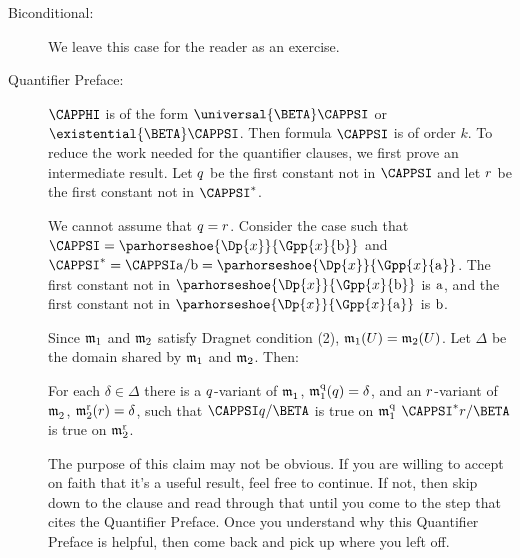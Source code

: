 \begin{PROOF}
\begin{description}
\begin{description}
\item[Biconditional:] We leave this case for the reader as an exercise.

\item[Quantifier Preface:] $\CAPPHI$ is of the form $\universal{\BETA}\CAPPSI$ or $\existential{\BETA}\CAPPSI$.
Then formula $\CAPPSI$ is of order $k$. To reduce the work needed for the quantifier clauses, we first prove an intermediate result.
Let $q$ be the first constant not in $\CAPPSI$ and let $r$ be the first constant not in $\CAPPSI^*$.

\begin{commentary}
	We cannot assume that $q=r$.
	Consider the case such that $\CAPPSI=\parhorseshoe{\Dp{\variable{x}}}{\Gpp{\variable{x}}{\constant{b}}}$ and $\CAPPSI^*=\CAPPSI\constant{a}/\constant{b}=\parhorseshoe{\Dp{\variable{x}}}{\Gpp{\variable{x}}{\constant{a}}}$.
	The first constant not in $\parhorseshoe{\Dp{\variable{x}}}{\Gpp{\variable{x}}{\constant{b}}}$ is $\mathrm{a}$, and the first constant not in $\parhorseshoe{\Dp{\variable{x}}}{\Gpp{\variable{x}}{\constant{a}}}$ is $\mathrm{b}$.
\end{commentary}

Since $\mathfrak{m}_1$ and $\mathfrak{m}_2$ satisfy Dragnet condition (2), $\mathfrak{m}_1(U)=\mathfrak{m}_2(U)$.
Let $\Delta$ be the domain shared by $\mathfrak{m}_1$ and $\mathfrak{m}_2$.
Then:

\begin{center}
	For each $\delta\in\Delta$ there is a $q$-variant of $\mathfrak{m^{\mathrm{}}_{\mathrm{1}}}$, $\mathfrak{m^{\mathrm{q}}_{\mathrm{1}}}(q)=\delta$, and an $r$-variant of $\mathfrak{m^{\mathrm{}}_{\mathrm{2}}}$, $\mathfrak{m^{\mathrm{r}}_{\mathrm{2}}}(r)=\delta$, such that $\CAPPSI\variable{q}/\BETA$ is true on $\mathfrak{m^{\mathrm{q}}_{\mathrm{1}}}$ \Iff $\CAPPSI^*\variable{r}/\BETA$ is true on $\mathfrak{m^{\mathrm{r}}_{\mathrm{2}}}$.
\end{center}

\begin{commentary}
	The purpose of this claim may not be obvious.
	If you are willing to accept on faith that it's a useful result, feel free to continue.
	If not, then skip down to the  clause and read through that until you come to the step that cites the Quantifier Preface.
	Once you understand why this Quantifier Preface is helpful, then come back and pick up where you left off.
\end{commentary}

\begin{SUBPROOF}


\end{SUBPROOF}
\end{description}
\end{description}
\end{PROOF}
